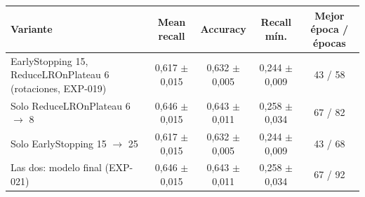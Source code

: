 \begin{tabular}{lcccc}
\toprule
Variante & Mean recall & Accuracy & Recall mín. & Mejor época / épocas \\
\midrule
EarlyStopping 15, ReduceLROnPlateau 6 (rotaciones, EXP-019) & 0,617 $\pm$ 0,015 & 0,632 $\pm$ 0,005 & 0,244 $\pm$ 0,009 & 43 / 58 \\
Solo ReduceLROnPlateau 6 $\rightarrow$ 8 & 0,646 $\pm$ 0,015 & 0,643 $\pm$ 0,011 & 0,258 $\pm$ 0,034 & 67 / 82 \\
Solo EarlyStopping 15 $\rightarrow$ 25 & 0,617 $\pm$ 0,015 & 0,632 $\pm$ 0,005 & 0,244 $\pm$ 0,009 & 43 / 68 \\
Las dos: modelo final (EXP-021) & 0,646 $\pm$ 0,015 & 0,643 $\pm$ 0,011 & 0,258 $\pm$ 0,034 & 67 / 92 \\
\bottomrule
\end{tabular}
